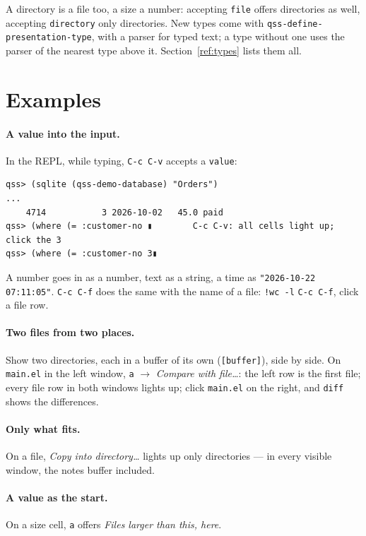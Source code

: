 \documentclass[
  paper=a4, fontsize=11pt, parskip=half, headings=small,
  toc=bibliography, numbers=noenddot, DIV=12
]{scrreprt}
\newcommand{\code}[1]{\texttt{#1}}
\newcommand{\file}[1]{\texttt{#1}}
\newcommand{\kbd}[1]{\texttt{#1}}
\begin{document}
A directory is a file too, a size a number: accepting \code{file} offers
directories as well, accepting \code{directory} only directories. New types come
with \code{qss-define-presentation-type}, with a parser for typed text; a type
without one uses the parser of the nearest type above it. Section~\ref{ref:types}
lists them all.

\section{Examples}

\paragraph{A value into the input.} In the REPL, while typing, \kbd{C-c C-v}
accepts a \code{value}:

\begin{Verbatim}
qss> (sqlite (qss-demo-database) "Orders")
...
    4714           3 2026-10-02   45.0 paid
qss> (where (= :customer-no ▮        C-c C-v: all cells light up; click the 3
qss> (where (= :customer-no 3▮
\end{Verbatim}

A number goes in as a number, text as a string, a time as
\code{"2026-10-22 07:11:05"}. \kbd{C-c C-f} does the same with the name of a
file: \code{!wc -l} \kbd{C-c C-f}, click a file row.

\paragraph{Two files from two places.} Show two directories, each in a buffer of
its own (\code{[buffer]}), side by side. On \file{main.el} in the left window,
\kbd{a} $\to$ \emph{Compare with file\ldots}: the left row is the first file;
every file row in both windows lights up; click \file{main.el} on the right,
and \code{diff} shows the differences.

\paragraph{Only what fits.} On a file, \emph{Copy into directory\ldots} lights up
only directories --- in every visible window, the notes buffer included.

\paragraph{A value as the start.} On a size cell, \kbd{a} offers \emph{Files
larger than this, here}.
\end{document}

